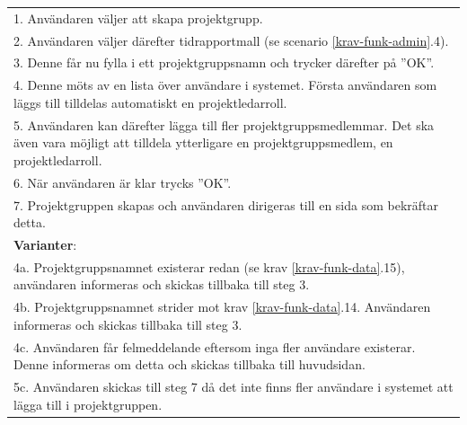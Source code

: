 \documentclass[a4paper]{article}
\begin{document}
\begin{table}[H]
\begin{tabular}{ | p{2cm} p{11cm} | }
	\multicolumn{2}{|p{13cm}|}{1. Användaren väljer att skapa projektgrupp.}\\
	\multicolumn{2}{|p{13cm}|}{2. Användaren väljer därefter tidrapportmall (se scenario \ref{krav-funk-admin}.4).}\\
	\multicolumn{2}{|p{13cm}|}{3. Denne får nu fylla i ett projektgruppsnamn och trycker därefter på ''OK''.} \\	
	\multicolumn{2}{|p{13cm}|}{4. Denne möts av en lista över användare i systemet. Första användaren som läggs till tilldelas automatiskt en projektledarroll.} \\	
	\multicolumn{2}{|p{13cm}|}{5. Användaren kan därefter lägga till fler projektgruppsmedlemmar. Det ska även vara möjligt att tilldela ytterligare en projektgruppsmedlem, en projektledarroll. } \\	
	\multicolumn{2}{|p{13cm}|}{6. När användaren är klar trycks ''OK''. } \\	
	\multicolumn{2}{|p{13cm}|}{7. Projektgruppen skapas och användaren dirigeras till en sida som bekräftar detta. } \\	
	\hline
    \multicolumn{2}{|p{13cm}|}{\textbf{Varianter}: }\\
    \multicolumn{2}{|p{13cm}|}{4a. Projektgruppsnamnet existerar redan (se krav \ref{krav-funk-data}.15), användaren informeras och skickas tillbaka till steg 3.}\\
    \multicolumn{2}{|p{13cm}|}{4b. Projektgruppsnamnet strider mot krav \ref{krav-funk-data}.14. Användaren informeras och skickas tillbaka till steg 3.}  \\
    \multicolumn{2}{|p{13cm}|}{4c. Användaren får felmeddelande eftersom inga fler användare existerar. Denne informeras om detta och skickas tillbaka till huvudsidan.}\\
       \multicolumn{2}{|p{13cm}|}{5c. Användaren skickas till steg 7 då det inte finns fler användare i systemet att lägga till i projektgruppen.}\\
    \hline
\end{tabular}
\end{table}




\end{document}
